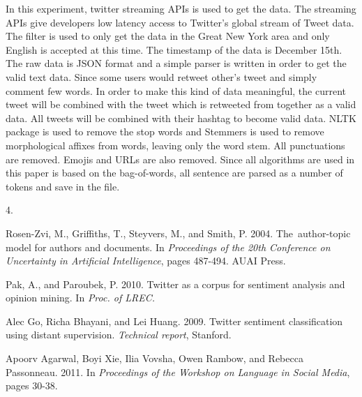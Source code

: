 \documentclass[12pt]{amsart}
\newcommand{\0}{\mat{0}}
\newcommand{\1}{\mathds{1}}
\begin{document}
In this experiment, twitter streaming APIs is used to get the data. The streaming APIs give developers low latency access to Twitter's global stream of Tweet data. The filter is used to only get the data in the Great New York area and only English is accepted at this time. The timestamp of the data is December 15th. The raw data is JSON format and a simple parser is written in order to get the valid text data. Since some users would retweet other's tweet and simply comment few words. In order to make this kind of data meaningful, the current tweet will be combined with the tweet which is retweeted from together as a valid data. All tweets will be combined with their hashtag to become valid data. NLTK package is used to remove the stop words and Stemmers is used to remove morphological affixes from words, leaving only the word stem. All punctuations are removed. Emojis and URLs are also removed. Since all algorithms are used in this paper is based on the bag-of-words, all sentence are parsed as a number of tokens and save in the file.

4.

\begin{thebibliography}{1}

	  Rosen-Zvi, M., Griffiths, T., Steyvers, M., and Smith, P. 2004. The author-topic model for authors and documents. In \emph{Proceedings of the 20th Conference on Uncertainty in Artificial Intelligence}, pages 487-494. AUAI Press.\smallskip
	
	 Pak, A., and Paroubek, P. 2010. Twitter as a corpus for sentiment analysis and opinion mining. In \emph{Proc. of LREC.}\smallskip
	
	 Alec Go, Richa Bhayani, and Lei Huang. 2009. Twitter sentiment classification using distant supervision. \emph{Technical report}, Stanford.
	
	 Apoorv Agarwal, Boyi Xie, Ilia Vovsha, Owen Rambow, and Rebecca Passonneau. 2011. In \emph{Proceedings of the Workshop on Language in Social Media}, pages 30-38.
	
\end{thebibliography}


 

\end{document}
